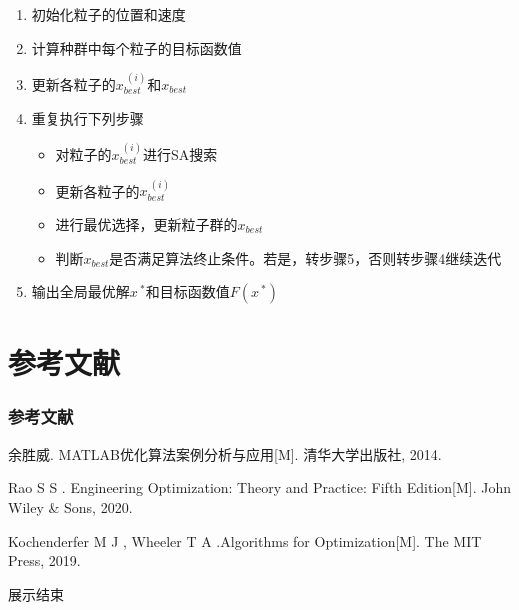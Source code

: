 \documentclass{beamer}
\begin{document}
	\begin{frame}
		\begin{enumerate}
			\item 初始化粒子的位置和速度
			\item 计算种群中每个粒子的目标函数值
			\item 更新各粒子的$x^{~(i)}_{best}$和$x_{best}$
			\item 重复执行下列步骤
			\begin{itemize}
				\item 对粒子的$x^{~(i)}_{best}$进行SA搜索
				\item 更新各粒子的$x^{~(i)}_{best}$
				\item 进行最优选择，更新粒子群的$x_{best}$
				\item 判断$x_{best}$是否满足算法终止条件。若是，转步骤5，否则转步骤4继续迭代
			\end{itemize}
			\item 输出全局最优解$x^{~*}$和目标函数值$F(x^{~*})$
		\end{enumerate}
	\end{frame}

	\section{参考文献}
	
	\begin{frame}
		\frametitle{参考文献}
		
		\begin{thebibliography}{99}
		余胜威. MATLAB优化算法案例分析与应用[M]. 清华大学出版社, 2014.
			
		Rao S S . Engineering Optimization: Theory and Practice: Fifth Edition[M]. John Wiley \& Sons, 2020.
			
		Kochenderfer M J , Wheeler T A .Algorithms for Optimization[M]. The MIT Press, 2019.
			
		\end{thebibliography}
	\end{frame}

	\begin{frame}
		\Huge{\centerline{展示结束}}
	\end{frame}
	
\end{document}
